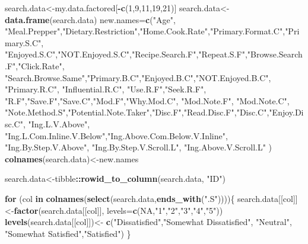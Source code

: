\documentclass[
]{article}
\newenvironment{Shaded}{\begin{snugshade}}{\end{snugshade}}
\newcommand{\ControlFlowTok}[1]{\textcolor[rgb]{0.13,0.29,0.53}{\textbf{#1}}}
\newcommand{\DataTypeTok}[1]{\textcolor[rgb]{0.13,0.29,0.53}{#1}}
\newcommand{\DecValTok}[1]{\textcolor[rgb]{0.00,0.00,0.81}{#1}}
\newcommand{\KeywordTok}[1]{\textcolor[rgb]{0.13,0.29,0.53}{\textbf{#1}}}
\newcommand{\NormalTok}[1]{#1}
\newcommand{\OperatorTok}[1]{\textcolor[rgb]{0.81,0.36,0.00}{\textbf{#1}}}
\newcommand{\OtherTok}[1]{\textcolor[rgb]{0.56,0.35,0.01}{#1}}
\newcommand{\StringTok}[1]{\textcolor[rgb]{0.31,0.60,0.02}{#1}}
\begin{document}
\begin{Shaded}
\begin{Highlighting}[]
\NormalTok{search.data<-my.data.factored[}\OperatorTok{-}\KeywordTok{c}\NormalTok{(}\DecValTok{1}\NormalTok{,}\DecValTok{9}\NormalTok{,}\DecValTok{11}\NormalTok{,}\DecValTok{19}\NormalTok{,}\DecValTok{21}\NormalTok{)]}
\NormalTok{search.data<-}\KeywordTok{data.frame}\NormalTok{(search.data)}
\NormalTok{new.names=}\KeywordTok{c}\NormalTok{(}\StringTok{"Age"}\NormalTok{, }\StringTok{"Meal.Prepper"}\NormalTok{,}\StringTok{"Dietary.Restriction"}\NormalTok{,}\StringTok{"Home.Cook.Rate"}\NormalTok{,}\StringTok{"Primary.Format.C"}\NormalTok{,}\StringTok{"Primary.S.C"}\NormalTok{,}
            \StringTok{"Enjoyed.S.C"}\NormalTok{,}\StringTok{"NOT.Enjoyed.S.C"}\NormalTok{,}\StringTok{"Recipe.Search.F"}\NormalTok{,}\StringTok{"Repeat.S.F"}\NormalTok{,}\StringTok{"Browse.Search.F"}\NormalTok{,}\StringTok{"Click.Rate"}\NormalTok{,}
            \StringTok{"Search.Browse.Same"}\NormalTok{,}\StringTok{"Primary.B.C"}\NormalTok{,}\StringTok{"Enjoyed.B.C"}\NormalTok{,}\StringTok{"NOT.Enjoyed.B.C"}\NormalTok{, }\StringTok{"Primary.R.C"}\NormalTok{, }\StringTok{"Influential.R.C"}\NormalTok{,}
            \StringTok{"Use.R.F"}\NormalTok{,}\StringTok{"Seek.R.F"}\NormalTok{, }\StringTok{"R.F"}\NormalTok{,}\StringTok{"Save.F"}\NormalTok{,}\StringTok{"Save.C"}\NormalTok{,}\StringTok{"Mod.F"}\NormalTok{,}\StringTok{"Why.Mod.C"}\NormalTok{, }\StringTok{"Mod.Note.F"}\NormalTok{, }\StringTok{"Mod.Note.C"}\NormalTok{,}
            \StringTok{"Note.Method.S"}\NormalTok{,}\StringTok{"Potential.Note.Taker"}\NormalTok{,}\StringTok{"Disc.F"}\NormalTok{,}\StringTok{"Read.Disc.F"}\NormalTok{,}\StringTok{"Disc.C"}\NormalTok{,}\StringTok{"Enjoy.Disc.C"}\NormalTok{, }\StringTok{"Ing.L.V.Above"}\NormalTok{,}
            \StringTok{"Ing.L.Com.Inline.V.Below"}\NormalTok{,}\StringTok{"Ing.Above.Com.Below.V.Inline"}\NormalTok{,  }\StringTok{"Ing.By.Step.V.Above"}\NormalTok{,  }\StringTok{"Ing.By.Step.V.Scroll.L"}\NormalTok{,}
            \StringTok{"Ing.Above.V.Scroll.L"}
\NormalTok{            )}
\KeywordTok{colnames}\NormalTok{(search.data)<-new.names}

\NormalTok{search.data<-tibble}\OperatorTok{::}\KeywordTok{rowid_to_column}\NormalTok{(search.data, }\StringTok{"ID"}\NormalTok{)}

\ControlFlowTok{for}\NormalTok{ (col }\ControlFlowTok{in} \KeywordTok{colnames}\NormalTok{(}\KeywordTok{select}\NormalTok{(search.data,}\KeywordTok{ends_with}\NormalTok{(}\StringTok{".S"}\NormalTok{))))\{}
\NormalTok{  search.data[[col]]<-}\KeywordTok{factor}\NormalTok{(search.data[[col]], }\DataTypeTok{levels=}\KeywordTok{c}\NormalTok{(}\OtherTok{NA}\NormalTok{,}\StringTok{"1"}\NormalTok{,}\StringTok{"2"}\NormalTok{,}\StringTok{"3"}\NormalTok{,}\StringTok{"4"}\NormalTok{,}\StringTok{"5"}\NormalTok{))}
  \KeywordTok{levels}\NormalTok{(search.data[[col]])<-}\StringTok{ }\KeywordTok{c}\NormalTok{(}\StringTok{"Dissatisfied"}\NormalTok{,}\StringTok{"Somewhat Dissatisfied"}\NormalTok{, }\StringTok{"Neutral"}\NormalTok{,}
           \StringTok{"Somewhat Satisfied"}\NormalTok{,}\StringTok{"Satisfied"}\NormalTok{)}
\NormalTok{\}}


\end{Highlighting}
\end{Shaded}
\end{document}
